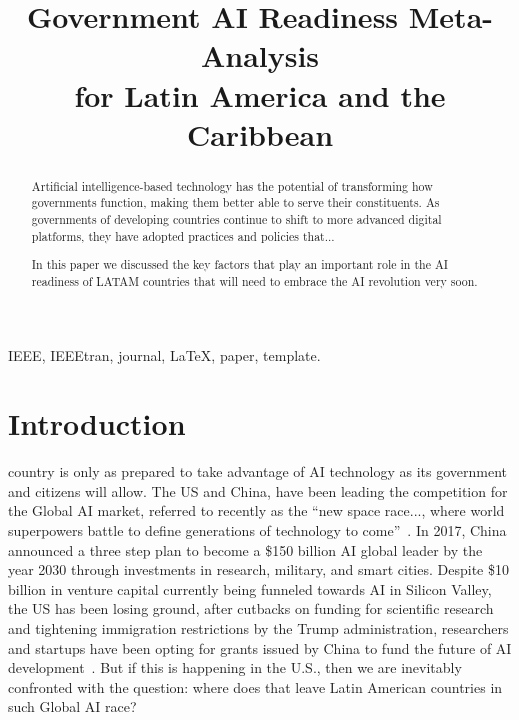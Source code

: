 \documentclass[conference]{IEEEtran}
\begin{document}
\title{Government AI Readiness Meta-Analysis\\for Latin America and the Caribbean 
}

\author{
\and
{}
}

\maketitle

\begin{abstract}
Artificial intelligence-based technology has the potential of transforming how governments function, making them better able to serve their constituents. As governments of developing countries continue to shift to more advanced digital platforms, they have adopted practices and policies that... 

In this paper we discussed the key factors that play an important role in the AI readiness of LATAM countries that will need to embrace the AI revolution very soon.
\end{abstract}

\begin{IEEEkeywords}
IEEE, IEEEtran, journal, \LaTeX, paper, template.
\end{IEEEkeywords}



\section{Introduction}

 country is only as prepared to take advantage of AI technology as its government and citizens will allow. The US and China, have been leading the competition for the Global AI market, referred to recently as the ``new space race..., where world superpowers battle to define generations of technology to come''~\cite{gershgorn2018ai}. In 2017, China announced a three step plan to become a \$150 billion AI global leader by the year 2030 through investments in research, military, and smart cities. Despite \$10 billion in venture capital currently being funneled towards AI in Silicon Valley, the US has been losing ground, after cutbacks on funding for scientific research and tightening immigration restrictions by the Trump administration, researchers and startups have been opting for grants issued by China to fund the future of AI development~\cite{mozur2017china}. But if this is happening in the U.S., then we are inevitably confronted with the question: where does that leave Latin American countries in such Global AI race?
\end{document}
